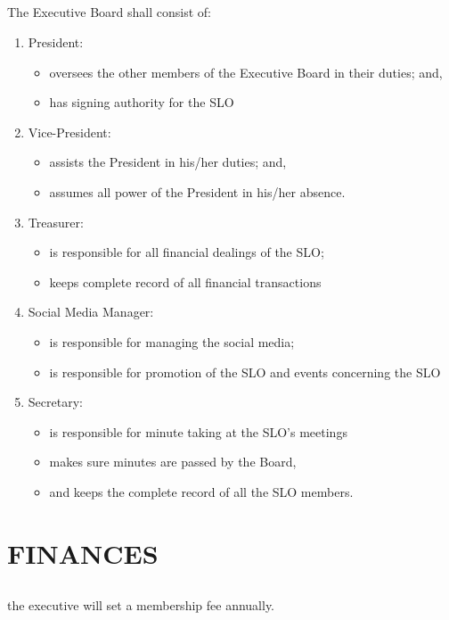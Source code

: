\documentclass{article}
\begin{document}
\subsection{}
The Executive Board shall consist of:
\begin{enumerate}[label=\alph*)]
	\item President: 
		\begin{itemize}
			\item oversees the other members of the Executive Board in their duties; and,
			\item has signing authority for the SLO
		\end{itemize}
	\item Vice-President:
		\begin{itemize}
			\item assists the President in his/her duties; and,
			\item assumes all power of the President in his/her absence.
		\end{itemize}
	\item Treasurer:
		\begin{itemize}
			\item is responsible for all financial dealings of the SLO;
			\item keeps complete record of all financial transactions
		\end{itemize}
	\item Social Media Manager:
		\begin{itemize}
			\item is responsible for managing the social media;
			\item is responsible for promotion of the SLO and events concerning the SLO
		\end{itemize}
	\item Secretary:
		\begin{itemize}
			\item is responsible for minute taking at the SLO's meetings
			\item makes sure minutes are passed by the Board,
			\item and keeps the complete record of all the SLO members.
		\end{itemize}
\end{enumerate}
\section{FINANCES}
\subsection{}
the executive will set a membership fee annually.
\end{document}
